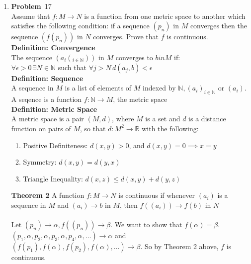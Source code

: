 \documentclass[12pt]{amsart}
\newcommand{\benu}{\begin{enumerate}}
\newcommand{\eenu}{\end{enumerate}}
\theoremstyle{definition}
\newcommand{\mbR}{\mathbb{R}}
\newcommand{\mbN}{\mathbb{N}}
\newcommand{\itep}{\item {\bfseries Problem}\ }
\begin{document}
\begin{enumerate}[series=p]
\itep 17 \\
Assume that $f:M \rightarrow N$ is a function from one metric space to another which satisfies the following condition:  if a sequence $(p_n)$ in $M$ converges then the sequence $(f(p_n))$ in $N$ converges.  Prove that $f$ is continuous.
\\
\textbf{Definition: Convergence}\\
The sequence $(a_i(_{i \in \mbN}))$ in $M$ converges to $b in M$ if:\\
$\forall \epsilon > 0 \, \exists N \in \mbN$ such that $\forall j>N \, d(a_j,b) < \epsilon$
\\
\textbf{Definition: Sequence}\\
A sequence in $M$ is a list of elements of $M$ indexed by $\mbN, (a_i)_{i \in \mbN}$ or $(a_i)$.  A seqence is a function $f : \mbN \to M$, the metric space\\
\textbf{Definition: Metric Space}\\
A metric space is a pair $(M, d)$, where $M$ is a set and $d$ is a distance function on pairs of $M$, so that $d : M^2 \to \mbR$ with the following:
\benu
\item Positive Definiteness: $d(x, y) > 0$, and $d(x, y) = 0 \implies x = y$
\item Symmetry: $d(x, y) = d(y, x)$
\item Triangle Inequality: $d(x, z) \leq d(x,y) + d(y,z)$
\eenu
\textbf{Theorem 2}
A function $f: M \to N$ is continuous if whenever $(a_i)$ is a sequence in $M$ and $(a_i) \to b$ in $M$, then $f((a_i)) \to f(b)$ in $N$\\
\\
Let $(p_n) \to \alpha, f((p_n)) \to \beta$.  We want to show that $f(\alpha) = \beta$.  $(p_1, \alpha, p_2, \alpha,p_3, \alpha,p_4, \alpha, \dots) \to \alpha$ and $(f(p_1), f(\alpha), f(p_2), f(\alpha), \dots) \to \beta$.  So by Theorem 2 above, $f$ is continuous.
\newpage


\end{enumerate}
\end{document}
